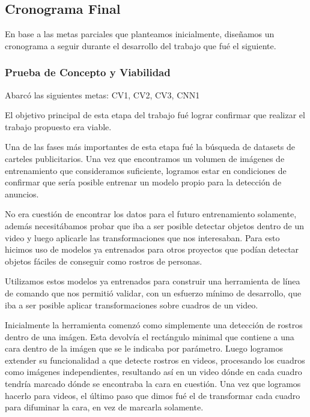 \documentclass[a4paper]{article}
\begin{document}
\subsection{Cronograma Final}

En base a las metas parciales que planteamos inicialmente, diseñamos un cronograma a seguir durante el desarrollo del trabajo que fué el siguiente.

\subsubsection{Prueba de Concepto y Viabilidad}

Abarcó las siguientes metas: CV1, CV2, CV3, CNN1

El objetivo principal de esta etapa del trabajo fué lograr confirmar que realizar el trabajo propuesto era viable.

Una de las fases más importantes de esta etapa fué la búsqueda de datasets de carteles publicitarios. Una vez que encontramos un volumen de imágenes de entrenamiento que consideramos suficiente, logramos estar en condiciones de confirmar que sería posible entrenar un modelo propio para la detección de anuncios.

No era cuestión de encontrar los datos para el futuro entrenamiento solamente, además necesitábamos probar que iba a ser posible detectar objetos dentro de un video y luego aplicarle las transformaciones que nos interesaban. Para esto hicimos uso de modelos ya entrenados para otros proyectos que podían detectar objetos fáciles de conseguir como rostros de personas.

Utilizamos estos modelos ya entrenados para construir una herramienta de línea de comando que nos permitió validar, con un esfuerzo mínimo de desarrollo, que iba a ser posible aplicar transformaciones sobre cuadros de un video.

Inicialmente la herramienta comenzó como simplemente una detección de rostros dentro de una imágen. Esta devolvía el rectángulo minimal que contiene a una cara dentro de la imágen que se le indicaba por parámetro.
Luego logramos extender su funcionalidad a que detecte rostros en videos, procesando los cuadros como imágenes independientes, resultando así en un video dónde en cada cuadro tendría marcado dónde se encontraba la cara en cuestión.
Una vez que logramos hacerlo para videos, el último paso que dimos fué el de transformar cada cuadro para difuminar la cara, en vez de marcarla solamente.
\end{document}
